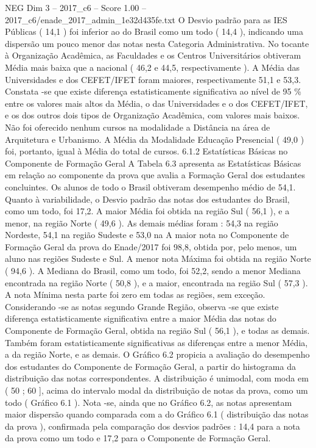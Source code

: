 \begin{textsample}{NEG Dim 3 – 2017\_c6 – Score 1.00 – 2017\_c6/enade\_2017\_admin\_1e32d435fe.txt}
O Desvio padrão para as IES Públicas ( 14,1 ) foi inferior ao do Brasil como um todo ( 14,4 ), indicando uma dispersão um pouco menor das notas nesta Categoria Administrativa.
No tocante à Organização Acadêmica, as Faculdades e os Centros Universitários obtiveram Média mais baixa que a nacional ( 46,2 e 44,5, respectivamente ).
A Média das Universidades e dos CEFET/IFET foram maiores, respectivamente 51,1 e 53,3.
Constata -se que existe diferença estatisticamente significativa ao nível de 95 \% entre os valores mais altos da Média, o das Universidades e o dos CEFET/IFET, e os dos outros dois tipos de Organização Acadêmica, com valores mais baixos.
Não foi oferecido nenhum cursos na modalidade a Distância na área de Arquitetura e Urbanismo.
A Média da Modalidade Educação Presencial ( 49,0 ) foi, portanto, igual à Média do total de cursos. 6.1.2 Estatísticas Básicas no Componente de Formação Geral A Tabela 6.3 apresenta as Estatísticas Básicas em relação ao componente da prova que avalia a Formação Geral dos estudantes concluintes.
Os alunos de todo o Brasil obtiveram desempenho médio de 54,1.
Quanto à variabilidade, o Desvio padrão das notas dos estudantes do Brasil, como um todo, foi 17,2.
A maior Média foi obtida na região Sul ( 56,1 ), e a menor, na região Norte ( 49,6 ).
As demais médias foram : 54,3 na região Nordeste, 54,1 na região Sudeste e 53,0 na A maior nota no Componente de Formação Geral da prova do Enade/2017 foi 98,8, obtida por, pelo menos, um aluno nas regiões Sudeste e Sul.
A menor nota Máxima foi obtida na região Norte ( 94,6 ).
A Mediana do Brasil, como um todo, foi 52,2, sendo a menor Mediana encontrada na região Norte ( 50,8 ), e a maior, encontrada na região Sul ( 57,3 ).
A nota Mínima nesta parte foi zero em todas as regiões, sem exceção.
Considerando -se as notas segundo Grande Região, observa -se que existe diferença estatisticamente significativa entre a maior Média das notas do Componente de Formação Geral, obtida na região Sul ( 56,1 ), e todas as demais.
Também foram estatisticamente significativas as diferenças entre a menor Média, a da região Norte, e as demais.
O Gráfico 6.2 propicia a avaliação do desempenho dos estudantes do Componente de Formação Geral, a partir do histograma da distribuição das notas correspondentes.
A distribuição é unimodal, com moda em ( 50 ; 60 ], acima do intervalo modal da distribuição de notas da prova, como um todo ( Gráfico 6.1 ).
Nota -se, ainda que no Gráfico 6.2, as notas apresentam maior dispersão quando comparada com a do Gráfico 6.1 ( distribuição das notas da prova ), confirmada pela comparação dos desvios padrões : 14,4 para a nota da prova como um todo e 17,2 para o Componente de Formação Geral.

\end{textsample}
